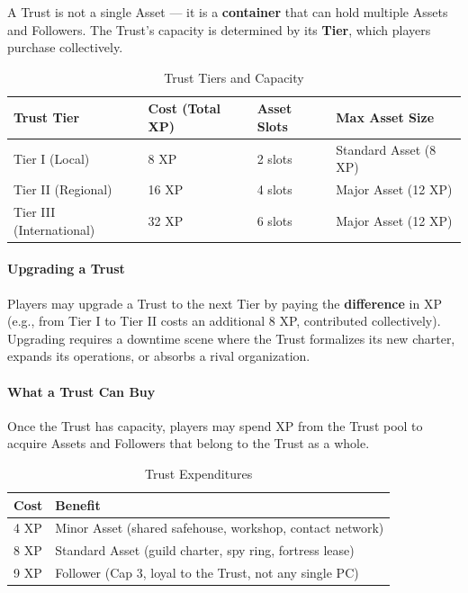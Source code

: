 A Trust is not a single Asset --- it is a \textbf{container} that can hold multiple Assets and Followers. The Trust's capacity is determined by its \textbf{Tier}, which players purchase collectively.

\begin{table}[htbp]
\centering
\small
\begin{tabularx}{\linewidth}{lXXX}
\toprule
\textbf{Trust Tier} & \textbf{Cost (Total XP)} & \textbf{Asset Slots} & \textbf{Max Asset Size} \\
\midrule
Tier I (Local) & 8 XP & 2 slots & Standard Asset (8 XP) \\
Tier II (Regional) & 16 XP & 4 slots & Major Asset (12 XP) \\
Tier III (International) & 32 XP & 6 slots & Major Asset (12 XP) \\
\bottomrule
\end{tabularx}
\caption{Trust Tiers and Capacity}
\label{tab:trust-tiers}
\end{table}

\paragraph{Upgrading a Trust}
Players may upgrade a Trust to the next Tier by paying the \textbf{difference} in XP (e.g., from Tier I to Tier II costs an additional 8 XP, contributed collectively). Upgrading requires a downtime scene where the Trust formalizes its new charter, expands its operations, or absorbs a rival organization.

\paragraph{What a Trust Can Buy}
Once the Trust has capacity, players may spend XP from the Trust pool to acquire Assets and Followers that belong to the Trust as a whole.

\begin{table}[htbp]
\centering
\small
\begin{tabularx}{\linewidth}{lX}
\toprule
\textbf{Cost} & \textbf{Benefit} \\
\midrule
4 XP & Minor Asset (shared safehouse, workshop, contact network) \\
8 XP & Standard Asset (guild charter, spy ring, fortress lease) \\
9 XP & Follower (Cap 3, loyal to the Trust, not any single PC) \\
\bottomrule
\end{tabularx}
\caption{Trust Expenditures}
\label{tab:trust-costs}
\end{table}

